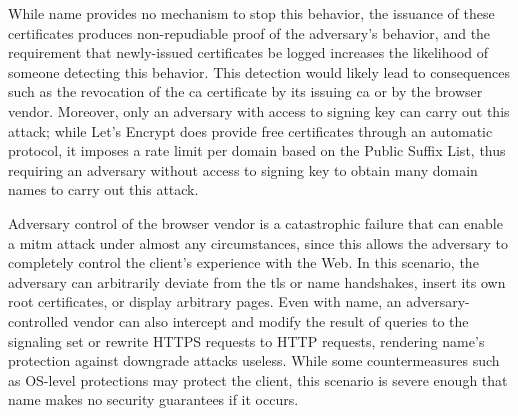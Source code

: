 While \ac{name} provides no mechanism to stop this behavior, the issuance of
these certificates produces non-repudiable proof of the adversary's behavior,
and the requirement that newly-issued certificates be logged increases the
likelihood of someone detecting this behavior. This detection would likely lead
to consequences such as the revocation of the \ac{ca} certificate by its issuing
\ac{ca} or by the browser vendor. Moreover, only an adversary with access to
 signing key can carry out this attack; while Let's Encrypt does provide
free certificates through an automatic protocol, it imposes a rate limit per
domain based on the Public Suffix
List, thus requiring an adversary
without access to  signing key to obtain many domain names to carry out
this attack.

Adversary control of the browser vendor is a catastrophic failure that can
enable a \ac{mitm} attack under almost any circumstances, since this allows the
adversary to completely control the client's experience with the Web. In this
scenario, the adversary can arbitrarily deviate from the \ac{tls} or \ac{name}
handshakes, insert its own root certificates, or display arbitrary pages. Even
with \ac{name}, an adversary-controlled vendor can also intercept and modify the
result of queries to the signaling set or rewrite HTTPS requests to HTTP
requests, rendering \ac{name}'s protection against downgrade attacks useless.
While some countermeasures such as OS-level protections may protect the client,
this scenario is severe enough that \ac{name} makes no security guarantees if it
occurs.

